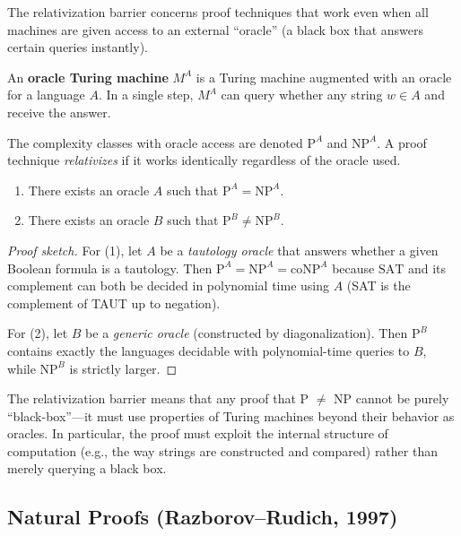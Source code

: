 The relativization barrier concerns proof techniques that work even when all machines are given access to an external ``oracle'' (a black box that answers certain queries instantly).

\begin{definition}
An \textbf{oracle Turing machine} $M^A$ is a Turing machine augmented with an oracle for a language $A$. In a single step, $M^A$ can query whether any string $w \in A$ and receive the answer.
\end{definition}

The complexity classes with oracle access are denoted $\text{P}^A$ and $\text{NP}^A$. A proof technique \emph{relativizes} if it works identically regardless of the oracle used.

\begin{theorem}
\begin{enumerate}
  \item There exists an oracle $A$ such that $\text{P}^A = \text{NP}^A$.
  \item There exists an oracle $B$ such that $\text{P}^B \neq \text{NP}^B$.
\end{enumerate}
\end{theorem}

\begin{proof}[Proof sketch]
For (1), let $A$ be a \emph{tautology oracle} that answers whether a given Boolean formula is a tautology. Then $\text{P}^A = \text{NP}^A = \text{coNP}^A$ because $\text{SAT}$ and its complement can both be decided in polynomial time using $A$ (SAT is the complement of TAUT up to negation).

For (2), let $B$ be a \emph{generic oracle} (constructed by diagonalization). Then $\text{P}^B$ contains exactly the languages decidable with polynomial-time queries to $B$, while $\text{NP}^B$ is strictly larger.
\end{proof}

\begin{remark}
The relativization barrier means that any proof that P $\neq$ NP cannot be purely ``black-box''---it must use properties of Turing machines beyond their behavior as oracles. In particular, the proof must exploit the internal structure of computation (e.g., the way strings are constructed and compared) rather than merely querying a black box.
\end{remark}

\subsection{Natural Proofs (Razborov--Rudich, 1997)}

